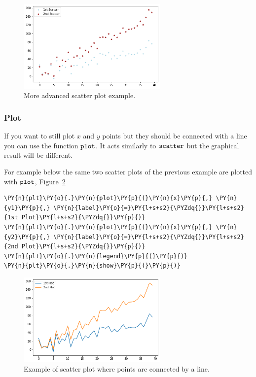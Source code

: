 \begin{figure}[htb]
	\centering
	\includegraphics[width=0.65\textwidth]{figures/scatter2}
	\caption{More advanced scatter plot example.}
	\label{fig:scatter2}
\end{figure}

\subsubsection{Plot}\label{plot}

If you want to still plot \(x\) and \(y\) points but they should be
connected with a line you can use the function \(\tt{plot}\). It acts
similarly to \(\tt{scatter}\) but the graphical result will be
different.

For example below the same two scatter plots of the previous example are
plotted with \(\tt{plot}\), Figure~\ref{fig:plot1}

\begin{tcolorbox}[breakable, size=fbox, boxrule=1pt, pad at break*=1mm,colback=cellbackground, colframe=cellborder]
\begin{Verbatim}[commandchars=\\\{\}]
\PY{n}{plt}\PY{o}{.}\PY{n}{plot}\PY{p}{(}\PY{n}{x}\PY{p}{,} \PY{n}{y1}\PY{p}{,} \PY{n}{label}\PY{o}{=}\PY{l+s+s2}{\PYZdq{}}\PY{l+s+s2}{1st Plot}\PY{l+s+s2}{\PYZdq{}}\PY{p}{)}
\PY{n}{plt}\PY{o}{.}\PY{n}{plot}\PY{p}{(}\PY{n}{x}\PY{p}{,} \PY{n}{y2}\PY{p}{,} \PY{n}{label}\PY{o}{=}\PY{l+s+s2}{\PYZdq{}}\PY{l+s+s2}{2nd Plot}\PY{l+s+s2}{\PYZdq{}}\PY{p}{)}
\PY{n}{plt}\PY{o}{.}\PY{n}{legend}\PY{p}{(}\PY{p}{)}
\PY{n}{plt}\PY{o}{.}\PY{n}{show}\PY{p}{(}\PY{p}{)}
\end{Verbatim}
\end{tcolorbox}

\begin{figure}[htb]
	\centering
	\includegraphics[width=0.65\textwidth]{figures/plot1}
	\caption{Example of scatter plot where points are connected by a line.}
	\label{fig:plot1}
\end{figure}

